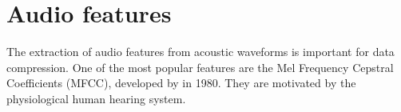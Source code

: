
\section{Audio features}
The extraction of audio features from acoustic waveforms is important for data compression.
One of the most popular features are the Mel Frequency Cepstral Coefficients (MFCC), developed by
\cite{Mermelstein1980} in 1980.
They are motivated by the physiological human hearing system.